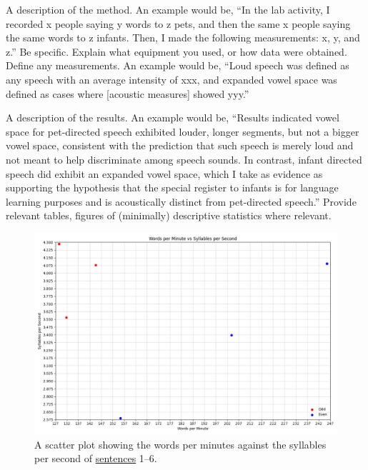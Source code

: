 \documentclass[lab=1,title={Speaking rate},turnin=false]{com310lab}
\begin{document}
\begin{method}
	A description of the method.
	An example would be,
	``In the lab activity, I recorded x people saying y words to z pets, and then the same x people saying the same words to z infants.
	Then, I made the following measurements: x, y, and z.''
	Be specific.
	Explain what equipment you used, or how data were obtained.
	Define any measurements.
	An example would be,
	``Loud speech was defined as any speech with an average intensity of xxx, and expanded vowel space was defined as cases where [acoustic measures] showed yyy.''
\end{method}

\begin{results}
	A description of the results.
	An example would be,
	``Results indicated vowel space for pet-directed speech exhibited louder, longer segments, but not a bigger vowel space, consistent with the prediction that such speech is merely loud and not meant to help discriminate among speech sounds.
	In contrast, infant directed speech did exhibit an expanded vowel space, which I take as evidence as supporting the hypothesis that the special register to infants is for language learning purposes and is acoustically distinct from pet-directed speech.''
	Provide relevant tables, figures of (minimally) descriptive statistics where relevant.


	\begin{figure}[H]
		\centering
		\caption{A scatter plot showing the words per minutes against the syllables per second of \hyperref[tab:data]{sentences} 1--6.}
		\label{fig:results}
		\includegraphics[width=\textwidth]{washington_lab1_graph}
	\end{figure}
\end{results}
\end{document}

